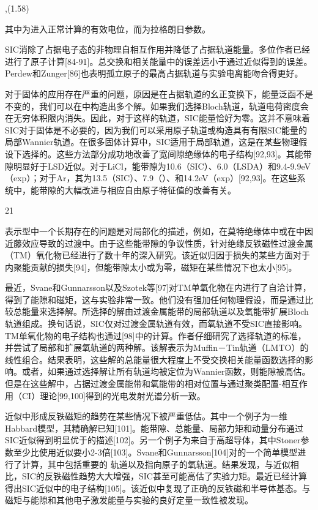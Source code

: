 ,(1.58)

其中为进入正常计算的有效电位，而为拉格朗日参数。

SIC消除了占据电子态的非物理自相互作用并降低了占据轨道能量。多位作者已经进行了原子计算[84-91]。总交换和相关能量中的误差远小于通过近似得到的误差。Perdew和Zunger[86]也表明孤立原子的最高占据轨道与实验电离能吻合得更好。

对于固体的应用存在严重的问题，原因是在占据轨道的幺正变换下，能量泛函不是不变的，我们可以在中构造出多个解。如果我们选择Bloch轨道，轨道电荷密度会在无穷体积限内消失。因此，对于这样的轨道，SIC能量恰好为零。这并不意味着SIC对于固体是不必要的，因为我们可以采用原子轨道或构造具有有限SIC能量的局部Wannier轨道。在很多固体计算中，SIC适用于局部轨道，这是在某些物理假设下选择的。这些方法部分成功地改善了宽间隙绝缘体的电子结构[92,93]。其能带隙明显好于LSD近似。对于LiCl，能带隙为10.6（SIC）、6.0（LSDA）和9.4-9.9eV（exp）；对于Ar，其为13.5（SIC）、7.9（）、和14.2eV（exp）[92,93]。在这些系统中，能带隙的大幅改进与相应自由原子特征值的改善有关。


21


表示型中一个长期存在的问题是对局部化的描述，例如，在莫特绝缘体中或在中因近藤效应导致的过渡中。由于这些能带隙的争议性质，针对绝缘反铁磁性过渡金属（TM）氧化物已经进行了数十年的深入研究。该近似归因于损失的某些方面对于内聚能贡献的损失[94]，但能带隙太小或为零，磁矩在某些情况下也太小[95]。

最近，Svane和Gunnarsson以及Szotek等[97]对TM单氧化物在内进行了自洽计算，得到了能隙和磁矩，这与实验非常一致。他们没有强加任何物理假设，而是通过比较总能量来选择解。所选择的解由过渡金属能带的局部轨道以及氧能带扩展Bloch轨道组成。换句话说，SIC仅对过渡金属轨道有效，而氧轨道不受SIC直接影响。TM单氧化物的电子结构也通过[98]中的计算。作者仔细研究了选择轨道的标准，并尝试了局部和扩展氧轨道的两种解。该解表示为Muffin－Tin轨道（LMTO）的线性组合。结果表明，这些解的总能量很大程度上不受交换相关能量函数选择的影响。或者，如果通过选择解让所有轨道均被定位为Wannier函数，则能隙被高估。但是在这些解中，占据过渡金属能带和氧能带的相对位置与通过聚类配置-相互作用（CI）理论[99,100]得到的光电发射光谱分析一致。

近似中形成反铁磁矩的趋势在某些情况下被严重低估。其中一个例子为一维Habbard模型，其精确解已知[101]。能带隙、总能量、局部力矩和动量分布通过SIC近似得到明显优于的描述[102]。另一个例子为来自于高超导体，其中Stoner参数至少比使用近似要小2-3倍[103]。Svane和Gunnarsson[104]对的一个简单模型进行了计算，其中包括重要的 轨道以及指向原子的氧轨道。结果发现，与近似相比，SIC的反铁磁性趋势大大增强，SIC甚至可能高估了实验力矩。最近已经计算得出SIC近似中的电子结构[105]。该近似中复现了正确的反铁磁和半导体基态。与磁矩与能隙和其他电子激发能量与实验的良好定量一致性被发现。



